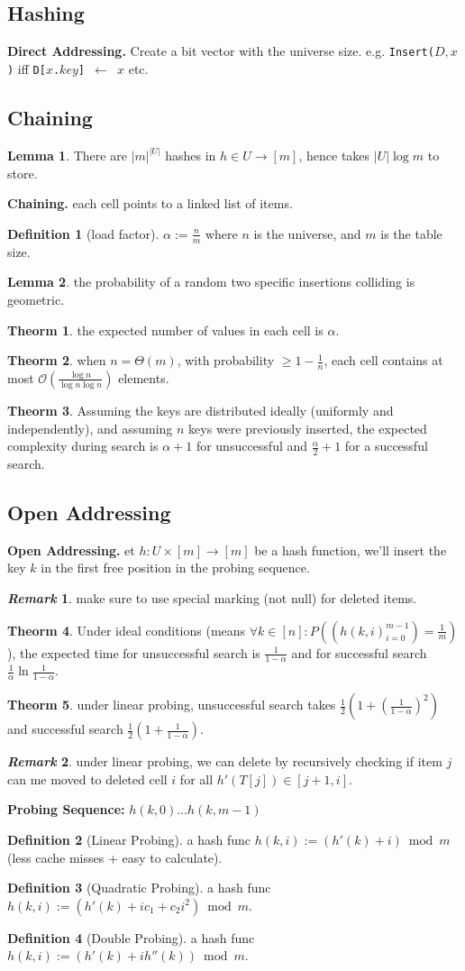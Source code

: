 \documentclass[]{article}
\newcommand\compactsubsection[1]        {\vspace{-10pt}\subsection{#1}\vspace{-6pt}}
\newcommand\compactsection   [1]        {\vspace{-10pt}\section{#1}\vspace{-6pt}}
\newcommand\subsectionrightaftersection {\vspace{10pt}}
\theoremstyle{definition}
\newtheorem{Theorem}{\color{theoColor}Theorm}
\newtheorem{Definition}{\color{defiColor}Definition}
\newtheorem{Lemma}{\color{lemColor}Lemma}
\newtheorem{Remark}{\textit{Remark}}
\newcommand\theo  [1] {\begin{Theorem}#1\end{Theorem}}
\newcommand\lem   [1] {\begin{Lemma}#1\end{Lemma}}
\newcommand\oc    {\mathcal{O}}
\newcommand\set   {\ell et \text{ }}
\newcommand\co        {\colon}
\newcommand\ag        {\alpha}
\newcommand\logn      {\log n}
\newcommand\cl [1]    {\left ( #1 \right )}
\begin{document}
\begin{multicols}{4}
		
		\compactsection{Hashing}\subsectionrightaftersection
			\textbf{Direct Addressing. }Create a bit vector with the universe size. e.g. \texttt{Insert($D, x$)} iff \texttt{D[$x$.$key$] $\gets$ $x$} etc. 
			\compactsubsection{Chaining}
				\lem{There are $|m|^{|U|}$ hashes in $h \in U \to [m]$, hence takes $|U|\log m$ to store. }
				\textbf{Chaining. }each cell points to a linked list of items. 
				\begin{Definition}[load factor]
					$\ag := \frac{n}{m}$ where $n$ is the universe, and $m$ is the table size. 
				\end{Definition}
				\lem{the probability of a random two specific insertions colliding is geometric. }
				\theo{the expected number of values in each cell is $\ag$. }
				\theo{when $n = \Theta(m)$, with probability $\ge 1 - \frac{1}{n}$, each cell contains at most $\oc\cl{\frac{\logn}{\logn\logn}}$ elements. }
				\theo{Assuming the keys are distributed ideally (uniformly and independently), and assuming $n$ keys were previously inserted, the expected complexity during search is $\ag + 1$ for unsuccessful and $\frac{\ag}{2} + 1$ for a successful search. }
			
			\compactsubsection{Open Addressing}
				\textbf{Open Addressing. }\set $h \co U \times [m] \to [m]$ be a hash function, we'll insert the key $k$ in the first free position in the probing sequence. 
				
				\begin{Remark}
					make sure to use special marking (not null) for deleted items.  
				\end{Remark}
				
				\theo{Under ideal conditions (means $\forall k \in [n] \co P\cl{(h(k, i)_{i = 0}^{m - 1}) = \frac{1}{m}}$), the expected time for unsuccessful search is $\frac{1}{1 - \ag}$ and for successful search $\frac{1}{\ag} \ln \frac{1}{1 - \ag}$. } 
				
				\theo{under linear probing, unsuccessful search takes $\frac{1}{2}\cl{1 + \cl{\frac{1}{1 - \ag}}^2}$ and successful search $\frac{1}{2}\cl{1 + \frac{1}{1 - \ag}}$. }
				\begin{Remark}
					under linear probing, we can delete by recursively checking if item $j$ can me moved to deleted cell $i$ for all $h'(T[j]) \in [j + 1, i]$. 
				\end{Remark}
				
				\textbf{Probing Sequence: }$h(k, 0) \dots h(k, m - 1)$
				
				\begin{Definition}[Linear Probing]
				 	a hash func $h(k, i) := (h'(k) + i) \bmod m$ (less cache misses + easy to calculate). 
				\end{Definition}
				\begin{Definition}[Quadratic Probing]
					a hash func $h(k, i) := (h'(k) + ic_1 + c_2i^2) \bmod m$. 
				\end{Definition}
				\begin{Definition}[Double Probing]
					a hash func $h(k, i) := (h'(k) + ih''(k)) \bmod m$. 
				\end{Definition}
			

\end{multicols}
\end{document}

